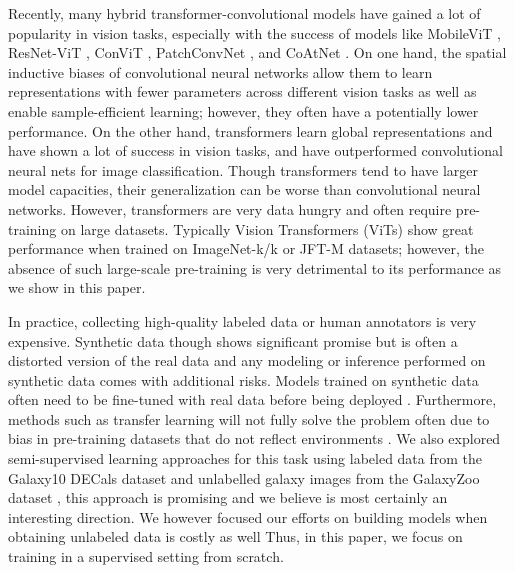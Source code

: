 \documentclass{article} \usepackage{iclr2023_conference,times}
\begin{document}
Recently, many hybrid transformer-convolutional models have gained a lot of popularity in vision tasks, especially with the success of models like MobileViT \citep{mehta2022mobilevit}, ResNet-ViT \citep{dosovitskiy2021an}, ConViT \citep{d2021convit}, PatchConvNet \citep{https://doi.org/10.48550/arxiv.2112.13692}, and CoAtNet \citep{dai2021coatnet}. On one hand, the spatial inductive biases of convolutional neural networks allow them to learn representations with fewer parameters across different vision tasks as well as enable sample-efficient learning; however, they often have a potentially lower performance. On the other hand, transformers learn global representations and have shown a lot of success in vision tasks, and have outperformed convolutional neural nets for image classification. Though transformers tend to have larger model capacities, their generalization can be worse than convolutional neural networks. However, transformers are very data hungry \citep{https://doi.org/10.48550/arxiv.2104.05704} and often require pre-training on large datasets. Typically Vision Transformers (ViTs) show great performance when trained on ImageNet-k/k \citep{deng2009imagenet} or JFT-M \citep{sun2017revisiting} datasets; however, the absence of such large-scale pre-training is very detrimental to its performance as we show in this paper.

In practice, collecting high-quality labeled data or human annotators is very expensive. Synthetic data though shows significant promise but is often a distorted version of the real data and any modeling or inference performed on synthetic data comes with additional risks. Models trained on synthetic data often need to be fine-tuned with real data before being deployed \citep{Tremblay_2018_CVPR_Workshops, https://doi.org/10.48550/arxiv.2205.03257}. Furthermore, methods such as transfer learning will not fully solve the problem often due to bias in pre-training datasets that do not reflect environments \citep{salman2023when}. We also explored semi-supervised learning approaches for this task using labeled data from the Galaxy10 DECals dataset \citep{2019MNRAS.483.3255L} and unlabelled galaxy images from the GalaxyZoo dataset \citep{2011MNRAS}, this approach is promising and we believe is most certainly an interesting direction. We however focused our efforts on building models when obtaining unlabeled data is costly as well Thus, in this paper, we focus on training in a supervised setting from scratch.
\end{document}
